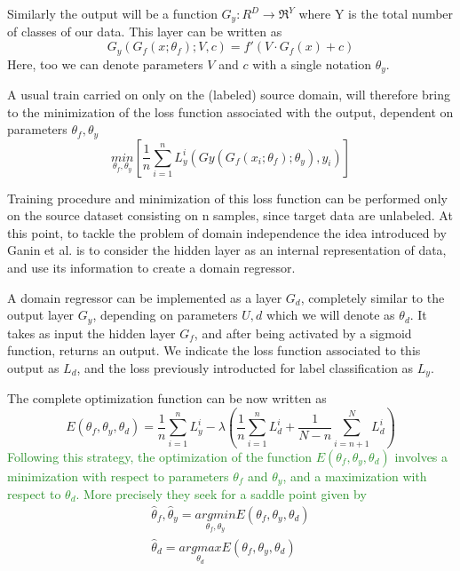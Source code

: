 \documentclass[11pt]{report}
\begin{document}
Similarly the output will be a function $G_y:R^D \rightarrow \Re^Y$ where Y is the total number of classes of our data. This layer can be written as
\begin{equation}
G_y(G_f(x; \theta_f); V, c) = f'(V\cdot G_f(x) + c)
\end{equation}
Here, too we can denote parameters $V$ and $c$ with a single notation $\theta_y$.

A usual train carried on only on the (labeled) source domain, will therefore bring to the minimization of the loss function associated with the output, dependent on parameters $\theta_f, \theta_y$
\begin{equation}
\underset{\theta_f, \theta_y}{min} [ \frac{1}{n}\sum_{i = 1}^n L_y^i(Gy(G_f(x_i; \theta_f); \theta_y), y_i )]
\end{equation}

Training procedure and minimization of this loss function can be performed only on the source dataset consisting on n samples, since target data are unlabeled.
At this point, to tackle the problem of domain independence the idea introduced by Ganin et al. is to consider the hidden layer as an internal representation of data, and use its information to create a domain regressor.

A domain regressor can be implemented as a layer $G_d$, completely similar to the output layer $G_y$, depending on parameters $U, d$ which we will denote as $\theta_d$. It takes as input the hidden layer $G_f$, and after being activated by a sigmoid function, returns an output.
We indicate the loss function associated to this output as $L_d$, and the loss previously introducted for label classification as $L_y$.

The complete optimization function can be now written as
\begin{equation}
E(\theta_f, \theta_y, \theta_d) = \frac{1}{n} \sum_{i = 1}^n L_y^i - \lambda (\frac{1}{n} \sum_{i = 1}^n L_d^i + \frac{1}{N-n} \sum_{i = n+1}^N L_d^i)
\end{equation}
\textcolor{ForestGreen}{
Following this strategy, the optimization of the function $E(\theta_f, \theta_y, \theta_d)$ involves a minimization with respect to parameters $\theta_f$ and $\theta_y$, and a maximization with respect to $\theta_d$. More precisely they seek for a saddle point given by
}
\begin{equation}
\begin{split}
\hat \theta_f, \hat \theta_y = \underset{\theta_f, \theta_y}{argmin} E(\theta_f, \theta_y, \theta_d) \\
\hat \theta_d = \underset{\theta_d}{argmax} E(\theta_f, \theta_y, \theta_d)
\end{split}
\end{equation}
\end{document}

